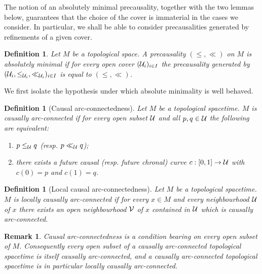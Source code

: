 \documentclass[a4paper,twoside]{article}
\newtheorem{defi}[lem]{Definition}
\newtheorem{rem}[lem]{Remark}
\begin{document}
The notion of an absolutely minimal precausality, together with the two lemmas below, guarantees that the choice of the cover is immaterial in the cases we consider. In particular, we shall be able to consider precausalities generated by refinements of a given cover.
\begin{defi}\label{def:topological_space_causality_absolutely} Let $M$ be a topological space.
A precausality $(\leq,\ll)$ on $M$ is absolutely minimal if for every open cover $(\mathcal{U}_i)_{i\in I}$ the precausality generated by $(\mathcal{U}_i,\leq_{\mathcal{U}_i}, \ll_{\mathcal{U}_i})_{i\in I}$ is equal to $(\leq,\ll)$.
\end{defi}

We first isolate the hypothesis under which absolute minimality is well behaved.

\begin{defi}[Causal arc-connectedness]\label{def:causal_arc_connectedness} Let $M$ be a topological spacetime. $M$ is causally arc-connected if for every open subset
$\mathcal{U}$ and all $p,q\in \mathcal{U}$ the following are equivalent:
\begin{enumerate}[label=(\roman*)]
\item $p\leq_{\mathcal{U}} q$ (resp. $p\ll_{\mathcal{U}} q$);
\item there exists a future causal (resp. future chronal) curve $c:[0,1]\rightarrow \mathcal{U}$ with $c(0)=p$ and $c(1)=q$.
\end{enumerate}
\end{defi}

\begin{defi}[Local causal arc-connectedness]\label{def:local_causal_arc_connectedness} Let $M$ be a topological spacetime.
$M$ is locally causally arc-connected if for every $x\in M$ and every neighbourhood $\mathcal{U}$ of $x$ there
exists an open neighbourhood $\mathcal V$ of $x$ contained in $\mathcal{U}$ which is causally arc-connected.
\end{defi}
\begin{rem}\label{rem:cac_local} Causal arc-connectedness is a condition bearing on \emph{every} open subset of $M$.
Consequently every open subset of a causally arc-connected topological spacetime is itself
causally arc-connected, and a causally arc-connected topological spacetime is in particular
locally causally arc-connected.
\end{rem}
\end{document}
